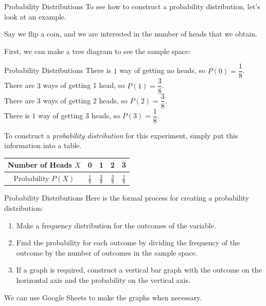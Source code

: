\documentclass[t, aspectratio=169]{beamer}
\newcommand{\?}{\stackrel{?}{=}}
\begin{document}
	\begin{frame}{Probability Distributions}
		To see how to construct a probability distribution, let's look at an example.
		
		Say we flip a coin, and we are interested in the number of heads that we obtain. \pause
		
		First, we can make a tree diagram to see the sample space:
	\end{frame}

	\begin{frame}{Probability Distributions}
		There is $1$ way of getting no heads, so $P(0) = \dfrac18$. \pause \\
		There are $3$ ways of getting 1 head, so $P(1) = \dfrac38$. \pause \\
		There are $3$ ways of getting 2 heads, so $P(2) = \dfrac38$. \pause \\
		There is $1$ way of getting 3 heads, so $P(3) = \dfrac18$. \pause
		
		To construct a \textit{probability distribution} for this experiment, simply put this information into a table. \pause
		
		\begin{tabular}{c|cccc}
			Number of Heads $X$ & 0 & 1 & 2 & 3 \\ \hline
			Probability $P(X)$ & $\frac18$ & $\frac38$ & $\frac38$ & $\frac18$
		\end{tabular}
	\end{frame}

	\begin{frame}{Probability Distributions}
		Here is the formal process for creating a probability distribution: \begin{enumerate}[1)]
			\item Make a frequency distribution for the outcomes of the variable. \pause
			\item Find the probability for each outcome by dividing the frequency of the outcome by the number of outcomes in the sample space. \pause
			\item If a graph is required, construct a vertical bar graph with the outcome on the horizontal axis and the probability on the vertical axis. \pause
		\end{enumerate}
	
		We can use Google Sheets to make the graphs when necessary.
	\end{frame}
\end{document}
